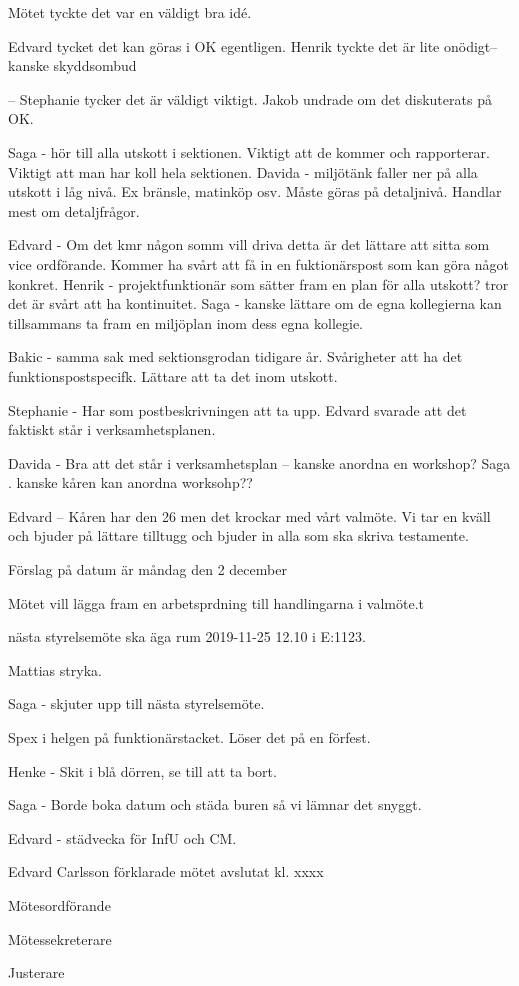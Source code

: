 \documentclass[10pt]{article}
\def\mo{Edvard Carlsson}
\def\ms{Mattias Lundström}
\def\ji{Jonathan Benitez}
\begin{document}
\begin{paragrafer}
Mötet tyckte det var en väldigt bra idé. 



Edvard tycket det kan göras i OK egentligen. Henrik tyckte det är lite onödigt-- kanske skyddsombud

-- Stephanie tycker det är väldigt viktigt. Jakob undrade om det diskuterats på OK.

Saga - hör till alla utskott i sektionen. Viktigt att de kommer och rapporterar. Viktigt att man har koll hela sektionen. 
Davida - miljötänk faller ner på alla utskott i låg nivå. Ex bränsle, matinköp osv. Måste göras på detaljnivå. Handlar mest om detaljfrågor.

Edvard - Om det kmr någon somm vill driva detta är det lättare att sitta som vice ordförande. Kommer ha svårt att få in en fuktionärspost som kan göra något konkret. 
Henrik - projektfunktionär som sätter fram en plan för alla utskott? tror det är svårt att ha kontinuitet. 
Saga - kanske lättare om de egna kollegierna kan tillsammans ta fram en miljöplan inom dess egna kollegie. 

Bakic - samma sak med sektionsgrodan tidigare år. Svårigheter att ha det funktionspostspecifk. Lättare att ta det inom utskott. 

Stephanie - Har som postbeskrivningen att ta upp. Edvard svarade att det faktiskt står i verksamhetsplanen. 

Davida - Bra att det står i verksamhetsplan -- kanske anordna en workshop? 
Saga . kanske kåren kan anordna worksohp??




Edvard -- Kåren har den 26 men det krockar med vårt valmöte. Vi tar en kväll och bjuder på lättare tilltugg och bjuder in alla som ska skriva testamente. 

Förslag på datum är måndag den 2 december



\Mba 
Mötet vill lägga fram en arbetsprdning till handlingarna i valmöte.t 

\Mba nästa styrelsemöte ska äga rum 2019-11-25 12.10 i E:1123.

Mattias stryka. 

Saga - skjuter upp till nästa styrelsemöte. 

Spex i helgen på funktionärstacket. Löser det på en förfest. 

Henke - Skit i blå dörren, se till att ta bort. 

Saga - Borde boka datum och städa buren så vi lämnar det snyggt. 

Edvard - städvecka för InfU och CM. 




{\mo} förklarade mötet avslutat kl. xxxx
\end{paragrafer}

\hidesignfoot
\begin{signatures}{3}
\signature{\mo}{Mötesordförande}
\signature{\ms}{Mötessekreterare}
\signature{\ji}{Justerare}
\end{signatures}
\end{document}
